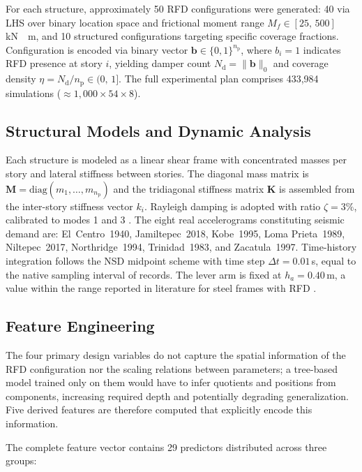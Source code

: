 \documentclass[preprint,12pt,authoryear]{elsarticle}
\newcommand{\nd}{N_{\mathrm{d}}}
\newcommand{\np}{n_{\mathrm{p}}}              %
\newcommand{\etad}{\eta}
\newcommand{\Mf}{M_{\!f}}
\newcommand{\ha}{h_a}
\newcommand{\KM}{\,\si{kN{\cdot}m}}
\begin{document}
For each structure, approximately 50 RFD configurations were generated: 40 via LHS over binary location space
and frictional moment range $\Mf \in [25,\,500]$\KM, and 10 structured configurations targeting specific
coverage fractions. Configuration is encoded via binary vector $\bm{b} \in \{0,1\}^{\np}$, where $b_i = 1$
indicates RFD presence at story $i$, yielding damper count $\nd = \|\bm{b}\|_0$ and coverage density
$\etad = \nd/\np \in (0,\,1]$. The full experimental plan comprises 433,984 simulations
($\approx 1,000 \times 54 \times 8$).

\subsection{Structural Models and Dynamic Analysis}
\label{sec:method:modelo}

Each structure is modeled as a linear shear frame with concentrated masses per story and lateral stiffness
between stories. The diagonal mass matrix is $\bm{M} = \mathrm{diag}(m_1,\ldots,m_{\np})$ and the tridiagonal
stiffness matrix $\bm{K}$ is assembled from the inter-story stiffness vector $k_i$. Rayleigh damping is adopted
with ratio $\zeta = 3\%$, calibrated to modes 1 and 3 \citep{chopra_dynamics_2015}. The eight real accelerograms
constituting seismic demand are: El~Centro~1940, Jamiltepec~2018, Kobe~1995, Loma Prieta~1989, Niltepec~2017,
Northridge~1994, Trinidad~1983, and Zacatula~1997. Time-history integration follows the NSD midpoint scheme
\citep{Namorado2024} with time step $\Delta t = 0.01$\,s, equal to the native sampling interval of records.
The lever arm is fixed at $\ha = 0.40$\,m, a value within the range reported in literature for steel frames
with RFD \citep{Mualla2002, Jarrahi2020jbe}.

\subsection{Feature Engineering}
\label{sec:method:features}

The four primary design variables do not capture the spatial information of the RFD configuration nor the
scaling relations between parameters; a tree-based model trained only on them would have to infer quotients
and positions from components, increasing required depth and potentially degrading generalization. Five
derived features are therefore computed that explicitly encode this information.

The complete feature vector contains 29 predictors distributed across three groups:
\end{document}

